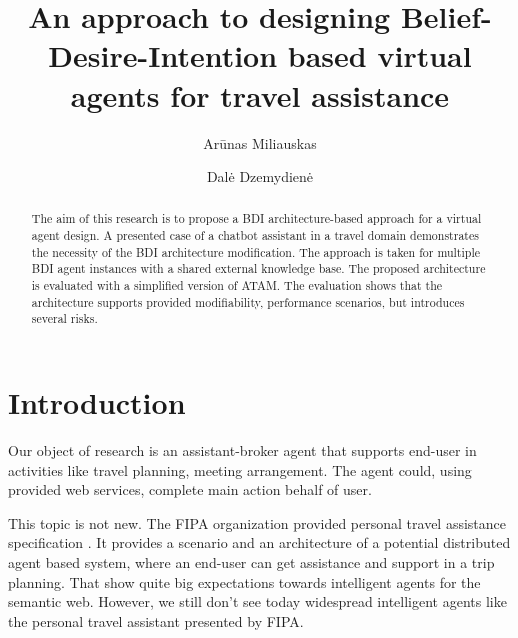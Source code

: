 \documentclass{llncs}
\begin{document}
%
\frontmatter          %
%
\pagestyle{headings}  %
%
\mainmatter              %

\title{An approach to designing Belief-Desire-Intention based virtual agents for travel assistance}

\author{Arūnas Miliauskas \and
Dalė Dzemydienė}


\maketitle
%
%
\begin{abstract}
	The aim of this research is to propose a \gls{BDI} architecture-based approach for a virtual agent design. A presented case of a chatbot assistant in a travel domain demonstrates the necessity of the \gls{BDI} architecture modification. The approach is taken for multiple  \gls{BDI} agent instances with a shared external knowledge base. The proposed architecture is evaluated with a simplified version of \gls{ATAM}. The evaluation shows that the architecture supports provided modifiability, performance scenarios, but introduces several risks.
{}
\end{abstract}
\section{Introduction}
 
Our object of research is an assistant-broker agent that supports end-user in activities like travel planning, meeting arrangement. The agent could, using provided web services, complete main action behalf of user. 

This topic is not new. %
The \gls{FIPA} organization provided personal travel assistance specification \cite{fipa000132000fipa}. It provides a scenario and an architecture of a potential distributed agent based system, where an end-user can get assistance and support in a trip planning. That show quite big expectations towards intelligent agents for the semantic web. However, we still don't see today widespread intelligent agents like the personal travel assistant presented by \gls{FIPA}.
\end{document}
